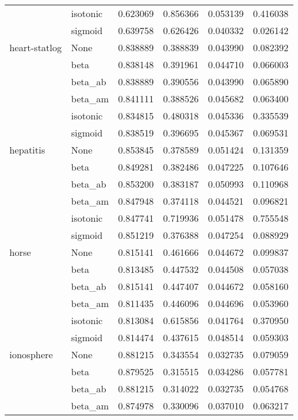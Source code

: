 \begin{tabular}{llrrrr}
        & isotonic &  0.623069 &  0.856366 &  0.053139 &  0.416038 \\
        & sigmoid &  0.639758 &  0.626426 &  0.040332 &  0.026142 \\
heart-statlog & None &  0.838889 &  0.388839 &  0.043990 &  0.082392 \\
        & beta &  0.838148 &  0.391961 &  0.044710 &  0.066003 \\
        & beta\_ab &  0.838889 &  0.390556 &  0.043990 &  0.065890 \\
        & beta\_am &  0.841111 &  0.388526 &  0.045682 &  0.063400 \\
        & isotonic &  0.834815 &  0.480318 &  0.045336 &  0.335539 \\
        & sigmoid &  0.838519 &  0.396695 &  0.045367 &  0.069531 \\
hepatitis & None &  0.853845 &  0.378589 &  0.051424 &  0.131359 \\
        & beta &  0.849281 &  0.382486 &  0.047225 &  0.107646 \\
        & beta\_ab &  0.853200 &  0.383187 &  0.050993 &  0.110968 \\
        & beta\_am &  0.847948 &  0.374118 &  0.044521 &  0.096821 \\
        & isotonic &  0.847741 &  0.719936 &  0.051478 &  0.755548 \\
        & sigmoid &  0.851219 &  0.376388 &  0.047254 &  0.088929 \\
horse & None &  0.815141 &  0.461666 &  0.044672 &  0.099837 \\
        & beta &  0.813485 &  0.447532 &  0.044508 &  0.057038 \\
        & beta\_ab &  0.815141 &  0.447407 &  0.044672 &  0.058160 \\
        & beta\_am &  0.811435 &  0.446096 &  0.044696 &  0.053960 \\
        & isotonic &  0.813084 &  0.615856 &  0.041764 &  0.370950 \\
        & sigmoid &  0.814474 &  0.437615 &  0.048514 &  0.059303 \\
ionosphere & None &  0.881215 &  0.343554 &  0.032735 &  0.079059 \\
        & beta &  0.879525 &  0.315515 &  0.034286 &  0.057781 \\
        & beta\_ab &  0.881215 &  0.314022 &  0.032735 &  0.054768 \\
        & beta\_am &  0.874978 &  0.330096 &  0.037010 &  0.063217 \\

\end{tabular}
